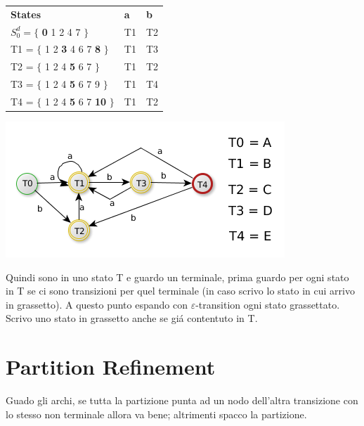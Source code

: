 \begin{tabular}{lll}
    \textbf{States}                                 &   \textbf{a}        &     \textbf{b} \\
    $S_0^d = \{$ \textbf{0} 1 2 4 7 $\}$            &   T1                &     T2 \\
    T1 = $\{$ 1 2 \textbf{3} 4 6 7 \textbf{8} $\}$  &   T1                &     T3 \\
    T2 = $\{$ 1 2 4 \textbf{5} 6 7 $\}$             &   T1                &     T2 \\
    T3 = $\{$ 1 2 4 \textbf{5} 6 7 9 $\}$           &   T1                &     T4 \\
    T4 = $\{$ 1 2 4 \textbf{5} 6 7 \textbf{10} $\}$ &   T1                &     T2 \\
\end{tabular}

\begin{center}
	\includegraphics[scale=0.5]{Chapters/Img/c02_04.png}\\
\end{center} 

Quindi sono in uno stato T e guardo un terminale, prima guardo per ogni stato 
in T se ci sono transizioni per quel terminale (in caso scrivo lo stato in cui arrivo in grassetto).
A questo punto espando con $\varepsilon$-transition ogni stato grassettato.
Scrivo uno stato in grassetto anche se gi\'a contentuto in T.

\section{Partition Refinement}
\begin{tcolorbox}\begin{center}
    Guado gli archi, se tutta la partizione punta ad un nodo dell'altra transizione con lo stesso non terminale allora va bene; 
    altrimenti spacco la partizione.
\end{center}\end{tcolorbox}

